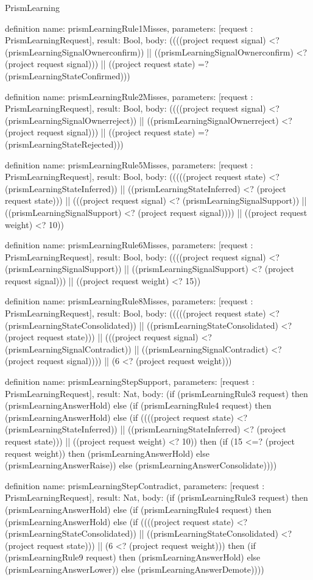 \begin{lexlean}{PrismLearning}
\begin{semanticmodule}
definition{
  name: prismLearningRule1Misses,
  parameters: [request : PrismLearningRequest],
  result: Bool,
  body: ((((project request signal) <? (prismLearningSignalOwnerconfirm)) || ((prismLearningSignalOwnerconfirm) <? (project request signal))) || ((project request state) =? (prismLearningStateConfirmed)))
}

definition{
  name: prismLearningRule2Misses,
  parameters: [request : PrismLearningRequest],
  result: Bool,
  body: ((((project request signal) <? (prismLearningSignalOwnerreject)) || ((prismLearningSignalOwnerreject) <? (project request signal))) || ((project request state) =? (prismLearningStateRejected)))
}

definition{
  name: prismLearningRule5Misses,
  parameters: [request : PrismLearningRequest],
  result: Bool,
  body: (((((project request state) <? (prismLearningStateInferred)) || ((prismLearningStateInferred) <? (project request state))) || (((project request signal) <? (prismLearningSignalSupport)) || ((prismLearningSignalSupport) <? (project request signal)))) || ((project request weight) <? 10))
}

definition{
  name: prismLearningRule6Misses,
  parameters: [request : PrismLearningRequest],
  result: Bool,
  body: ((((project request signal) <? (prismLearningSignalSupport)) || ((prismLearningSignalSupport) <? (project request signal))) || ((project request weight) <? 15))
}

definition{
  name: prismLearningRule8Misses,
  parameters: [request : PrismLearningRequest],
  result: Bool,
  body: (((((project request state) <? (prismLearningStateConsolidated)) || ((prismLearningStateConsolidated) <? (project request state))) || (((project request signal) <? (prismLearningSignalContradict)) || ((prismLearningSignalContradict) <? (project request signal)))) || (6 <? (project request weight)))
}

definition{
  name: prismLearningStepSupport,
  parameters: [request : PrismLearningRequest],
  result: Nat,
  body: (if (prismLearningRule3 request) then (prismLearningAnswerHold) else (if (prismLearningRule4 request) then (prismLearningAnswerHold) else (if ((((project request state) <? (prismLearningStateInferred)) || ((prismLearningStateInferred) <? (project request state))) || ((project request weight) <? 10)) then (if (15 <=? (project request weight)) then (prismLearningAnswerHold) else (prismLearningAnswerRaise)) else (prismLearningAnswerConsolidate))))
}

definition{
  name: prismLearningStepContradict,
  parameters: [request : PrismLearningRequest],
  result: Nat,
  body: (if (prismLearningRule3 request) then (prismLearningAnswerHold) else (if (prismLearningRule4 request) then (prismLearningAnswerHold) else (if ((((project request state) <? (prismLearningStateConsolidated)) || ((prismLearningStateConsolidated) <? (project request state))) || (6 <? (project request weight))) then (if (prismLearningRule9 request) then (prismLearningAnswerHold) else (prismLearningAnswerLower)) else (prismLearningAnswerDemote))))
}


\end{semanticmodule}
\end{lexlean}
